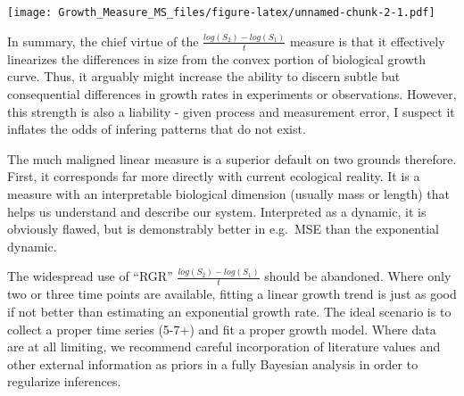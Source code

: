 \documentclass[]{article}
\begin{document}
\texttt{[image: Growth\_Measure\_MS\_files/figure-latex/unnamed-chunk-2-1.pdf]}

In summary, the chief virtue of the \(\frac{log(S_2) - log(S_1)}{t}\)
measure is that it effectively linearizes the differences in size from
the convex portion of biological growth curve. Thus, it arguably might
increase the ability to discern subtle but consequential differences in
growth rates in experiments or observations. However, this strength is
also a liability - given process and measurement error, I suspect it
inflates the odds of infering patterns that do not exist.

The much maligned linear measure is a superior default on two grounds
therefore. First, it corresponds far more directly with current
ecological reality. It is a measure with an interpretable biological
dimension (usually mass or length) that helps us understand and describe
our system. Interpreted as a dynamic, it is obviously flawed, but is
demonstrably better in e.g.~MSE than the exponential dynamic.

The widespread use of ``RGR'' \(\frac{log(S_2) - log(S_1)}{t}\) should
be abandoned. Where only two or three time points are available, fitting
a linear growth trend is just as good if not better than estimating an
exponential growth rate. The ideal scenario is to collect a proper time
series (5-7+) and fit a proper growth model. Where data are at all
limiting, we recommend careful incorporation of literature values and
other external information as priors in a fully Bayesian analysis in
order to regularize inferences.
\end{document}
